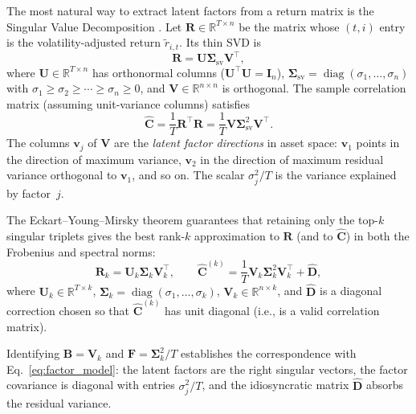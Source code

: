 \documentclass[11pt,a4paper]{article}
\newcommand{\C}{\mathbf{C}}
\newcommand{\I}{\mathbf{I}}
\newcommand{\R}{\mathbb{R}}
\newcommand{\Bload}{\mathbf{B}}
\newcommand{\Ffac}{\mathbf{F}}
\newcommand{\Dspe}{\mathbf{D}}
\begin{document}
The most natural way to extract latent factors from a return matrix is the
Singular Value Decomposition \citep{golub1996}.  Let
$\mathbf{R} \in \R^{T \times n}$ be the matrix whose $(t, i)$ entry is the
volatility-adjusted return $\tilde{r}_{i,t}$.  Its thin SVD is
\begin{equation}
  \label{eq:svd}
  \mathbf{R} = \mathbf{U}\bm{\Sigma}_{\mathrm{sv}}\mathbf{V}^\top,
\end{equation}
where $\mathbf{U} \in \R^{T \times n}$ has orthonormal columns
($\mathbf{U}^\top\mathbf{U} = \I_n$),
$\bm{\Sigma}_{\mathrm{sv}} = \operatorname{diag}(\sigma_1, \dots, \sigma_n)$
with $\sigma_1 \geq \sigma_2 \geq \cdots \geq \sigma_n \geq 0$, and
$\mathbf{V} \in \R^{n \times n}$ is orthogonal.  The sample correlation matrix
(assuming unit-variance columns) satisfies
\begin{equation}
  \label{eq:svd_cov}
  \hat{\C} = \frac{1}{T}\mathbf{R}^\top\mathbf{R}
           = \frac{1}{T}\mathbf{V}\bm{\Sigma}_{\mathrm{sv}}^2\mathbf{V}^\top.
\end{equation}
The columns $\mathbf{v}_j$ of $\mathbf{V}$ are the \emph{latent factor
directions} in asset space: $\mathbf{v}_1$ points in the direction of maximum
variance, $\mathbf{v}_2$ in the direction of maximum residual variance
orthogonal to $\mathbf{v}_1$, and so on.  The scalar $\sigma_j^2 / T$ is the
variance explained by factor~$j$.

The Eckart--Young--Mirsky theorem \citep{eckart1936} guarantees that retaining
only the top-$k$ singular triplets gives the best rank-$k$ approximation to
$\mathbf{R}$ (and to $\hat{\C}$) in both the Frobenius and spectral norms:
\begin{equation}
  \label{eq:truncated_svd}
  \mathbf{R}_k = \mathbf{U}_k\bm{\Sigma}_k\mathbf{V}_k^\top,
  \qquad
  \hat{\C}^{(k)} = \frac{1}{T}\mathbf{V}_k\bm{\Sigma}_k^2\mathbf{V}_k^\top
                 + \hat{\Dspe},
\end{equation}
where $\mathbf{U}_k \in \R^{T \times k}$,
$\bm{\Sigma}_k = \operatorname{diag}(\sigma_1, \dots, \sigma_k)$,
$\mathbf{V}_k \in \R^{n \times k}$, and $\hat{\Dspe}$ is a diagonal correction
chosen so that $\hat{\C}^{(k)}$ has unit diagonal (i.e., is a valid
correlation matrix).

Identifying $\Bload = \mathbf{V}_k$ and
$\Ffac = \bm{\Sigma}_k^2/T$ establishes the correspondence with
Eq.~\eqref{eq:factor_model}: the latent factors are the right singular
vectors, the factor covariance is diagonal with entries $\sigma_j^2/T$, and
the idiosyncratic matrix $\hat{\Dspe}$ absorbs the residual variance.
\end{document}
